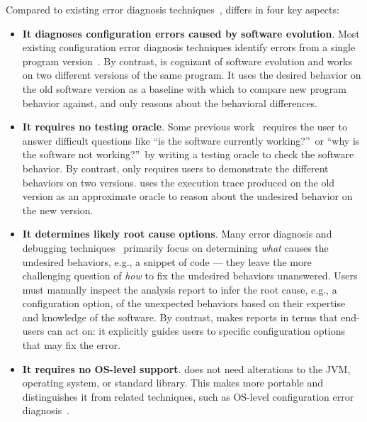 Compared to existing error diagnosis
techniques~\cite{Wang:2004:AMT, Rabkin:2011:PPC, Whitaker:2004:CDS,
Zhang:2013:ADS, Attariyan:2010:ACT, Su:2007:AIC, Attariyan:2008:UCD, xray
}, \ourtool differs in four
key aspects:

\vspace{-1mm}

\begin{itemize}
\vspace{-1mm}
\item \textbf{It diagnoses configuration errors caused by software evolution}.
Most existing configuration error diagnosis techniques
identify errors from a single program
version~\cite{Wang:2004:AMT, Rabkin:2011:PPC, Whitaker:2004:CDS,
Zhang:2013:ADS, Attariyan:2010:ACT, Su:2007:AIC, Attariyan:2008:UCD, xray}.
By contrast, \ourtool is cognizant of software evolution and
works on two different versions of the same program. 
It uses the desired behavior on the old software version
as a baseline with which to compare new program behavior against, and only
reasons about the behavioral differences.

\item \textbf{It requires no testing oracle}.
Some previous work~\cite{Rabkin:2011:PPC, Whitaker:2004:CDS,
Attariyan:2010:ACT, Su:2007:AIC} requires the user to answer difficult
questions like ``is the software currently working?''\ or ``why is the
software not working?''\ by writing a testing
oracle to check the software behavior. By contrast,
\ourtool only requires users to
demonstrate the different behaviors on two versions.
\ourtool uses the execution trace produced on the old
version as an approximate oracle to
reason about the undesired behavior on the new version.

\item \textbf{It determines likely root cause options}.
Many error diagnosis and debugging techniques~\cite{dd, autoflow}
primarily focus on
determining \textit{what} causes the undesired behaviors, e.g.,
a snippet of code --- they leave the more challenging
question of \textit{how} to fix the undesired behaviors
unanswered.  Users must manually inspect the analysis
report to infer
the root cause, e.g., a configuration option,
of the unexpected behaviors 
based on their expertise and knowledge of the software.
By contrast, \ourtool makes reports in terms that 
end-users can act on:  it explicitly guides users to specific
configuration options that may fix the error.

\item \textbf{It requires no OS-level support}. \ourtool
does not need alterations to the JVM, operating system, or
standard library. This makes \ourtool more portable and
distinguishes it from related techniques, such as
OS-level configuration error diagnosis~\cite{Whitaker:2004:CDS, Su:2007:AIC}.

\end{itemize}

